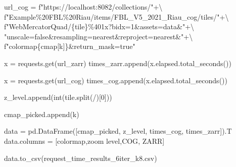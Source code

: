 \documentclass[
  oneside,
  open=any]{scrbook}
\newenvironment{Shaded}{\begin{snugshade}}{\end{snugshade}}
\newcommand{\BuiltInTok}[1]{\textcolor[rgb]{0.00,0.23,0.31}{#1}}
\newcommand{\DecValTok}[1]{\textcolor[rgb]{0.68,0.00,0.00}{#1}}
\newcommand{\NormalTok}[1]{\textcolor[rgb]{0.00,0.23,0.31}{#1}}
\newcommand{\OperatorTok}[1]{\textcolor[rgb]{0.37,0.37,0.37}{#1}}
\newcommand{\SpecialCharTok}[1]{\textcolor[rgb]{0.37,0.37,0.37}{#1}}
\newcommand{\SpecialStringTok}[1]{\textcolor[rgb]{0.13,0.47,0.30}{#1}}
\newcommand{\StringTok}[1]{\textcolor[rgb]{0.13,0.47,0.30}{#1}}
\begin{document}
\begin{Shaded}
\begin{Highlighting}[]
\NormalTok{        url\_cog }\OperatorTok{=} \SpecialStringTok{f"https://localhost:8082/collections/"}\OperatorTok{+\textbackslash{}}
        \SpecialStringTok{f"Example\%20FBL\%20Riau/items/FBL\_V5\_2021\_Riau\_cog/tiles/"}\OperatorTok{+\textbackslash{}}
        \SpecialStringTok{f"WebMercatorQuad/}\SpecialCharTok{\{}\NormalTok{tile}\SpecialCharTok{\}}\SpecialStringTok{\%401x?bidx=1\&assets=data\&"}\OperatorTok{+\textbackslash{}}
        \StringTok{"unscale=false\&resampling=nearest\&reproject=nearest\&"}\OperatorTok{+\textbackslash{}}
        \SpecialStringTok{f"colormap}\SpecialCharTok{\{}\NormalTok{cmap[k]}\SpecialCharTok{\}}\SpecialStringTok{\&return\_mask=true"}

\NormalTok{        x }\OperatorTok{=}\NormalTok{ requests.get(url\_zarr)}
\NormalTok{        times\_zarr.append(x.elapsed.total\_seconds())}

\NormalTok{        x }\OperatorTok{=}\NormalTok{ requests.get(url\_cog)}
\NormalTok{        times\_cog.append(x.elapsed.total\_seconds())}

\NormalTok{        z\_level.append(}\BuiltInTok{int}\NormalTok{(tile.split(}\StringTok{\textquotesingle{}/\textquotesingle{}}\NormalTok{)[}\DecValTok{0}\NormalTok{]))}

\NormalTok{        cmap\_picked.append(k)}

\NormalTok{data }\OperatorTok{=}\NormalTok{ pd.DataFrame([cmap\_picked, z\_level, times\_cog, times\_zarr]).T}
\NormalTok{data.columns }\OperatorTok{=}\NormalTok{ [}\StringTok{\textquotesingle{}colormap\textquotesingle{}}\NormalTok{,}\StringTok{\textquotesingle{}zoom level\textquotesingle{}}\NormalTok{,}\StringTok{\textquotesingle{}COG\textquotesingle{}}\NormalTok{, }\StringTok{\textquotesingle{}ZARR\textquotesingle{}}\NormalTok{]}

\NormalTok{data.to\_csv(}\StringTok{\textquotesingle{}request\_time\_results\_6iter\_k8.csv\textquotesingle{}}\NormalTok{)}
\end{Highlighting}
\end{Shaded}



\backmatter
\end{document}
